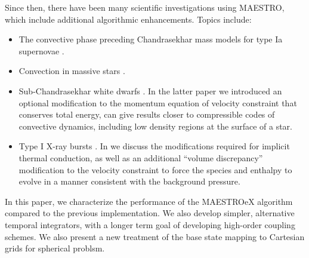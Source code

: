 \documentclass{aastex62}
\begin{document}
Since then, there have been many scientific investigations using MAESTRO, which include additional algorithmic enhancements.  Topics include:
\begin{itemize}
\item The convective phase preceding Chandrasekhar mass models for type Ia supernovae \citep{MAESTRO_convection,MAESTRO_AMR,MAESTRO_CASTRO}.
\item Convection in massive stars \citep{Gilet:2013}.
\item Sub-Chandrasekhar white dwarfs \citep{subChandra_I,subChandra_II}.  In the latter paper we introduced an optional modification to the momentum equation of velocity constraint that conserves total energy, can give results closer to compressible codes of convective dynamics, including low density regions at the surface of a star.
\item Type I X-ray bursts \citep{XRB_I,XRB_II,XRB_III}.  In \cite{XRB_I} we discuss the modifications required for implicit thermal conduction, as well as an additional ``volume discrepancy'' modification to the velocity constraint to force the species and enthalpy to evolve in a manner consistent with the background pressure.
\end{itemize}

In this paper, we characterize the performance of the MAESTROeX algorithm compared to the previous implementation.
We also develop simpler, alternative temporal integrators, with a longer term goal of developing high-order coupling schemes.
We also present a new treatment of the base state mapping to Cartesian grids for spherical problsm.
\end{document}
